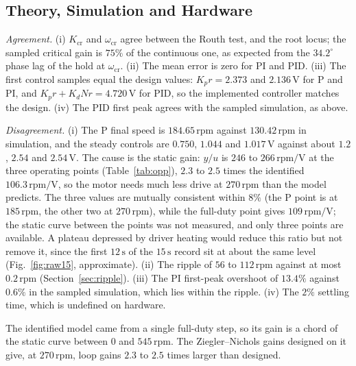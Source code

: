 \documentclass[lettersize,journal]{IEEEtran}
\newcommand{\code}[1]{\texttt{\detokenize{#1}}}
\newcommand{\Kcr}{K_{\mathrm{cr}}}
\newcommand{\wcr}{\omega_{\mathrm{cr}}}
\newcommand{\rpm}{\,\text{rpm}}
\begin{document}
\subsection{Theory, Simulation and Hardware}
\emph{Agreement.} (i) $\Kcr$ and $\wcr$ agree between the Routh test, \code{allmargin} and the root locus; the sampled critical gain is $75\%$ of the continuous one, as expected from the $34.2^\circ$ phase lag of the hold at $\wcr$. (ii) The mean error is zero for PI and PID. (iii) The first control samples equal the design values: $K_pr=2.373$ and $2.136\,\text{V}$ for P and PI, and $K_pr+K_dNr=4.720\,\text{V}$ for PID, so the implemented controller matches the design. (iv) The PID first peak agrees with the sampled simulation, as above.

\emph{Disagreement.} (i) The P final speed is $184.65\rpm$ against $130.42\rpm$ in simulation, and the steady controls are $0.750$, $1.044$ and $1.017\,\text{V}$ against about $1.2$, $2.54$ and $2.54\,\text{V}$. The cause is the static gain: $y/u$ is $246$ to $266\rpm/\text{V}$ at the three operating points (Table~\ref{tab:opp}), $2.3$ to $2.5$ times the identified $106.3\rpm/\text{V}$, so the motor needs much less drive at $270\rpm$ than the model predicts. The three values are mutually consistent within $8\%$ (the P point is at $185\rpm$, the other two at $270\rpm$), while the full-duty point gives $109\rpm/\text{V}$; the static curve between the points was not measured, and only three points are available. A plateau depressed by driver heating would reduce this ratio but not remove it, since the first $12\,\text{s}$ of the $15\,\text{s}$ record sit at about the same level (Fig.~\ref{fig:raw15}, approximate). (ii) The ripple of $56$ to $112\rpm$ against at most $0.2\rpm$ (Section~\ref{sec:ripple}). (iii) The PI first-peak overshoot of $13.4\%$ against $0.6\%$ in the sampled simulation, which lies within the ripple. (iv) The $2\%$ settling time, which is undefined on hardware.

The identified model came from a single full-duty step, so its gain is a chord of the static curve between $0$ and $545\rpm$. The Ziegler--Nichols gains designed on it give, at $270\rpm$, loop gains $2.3$ to $2.5$ times larger than designed.
\end{document}
